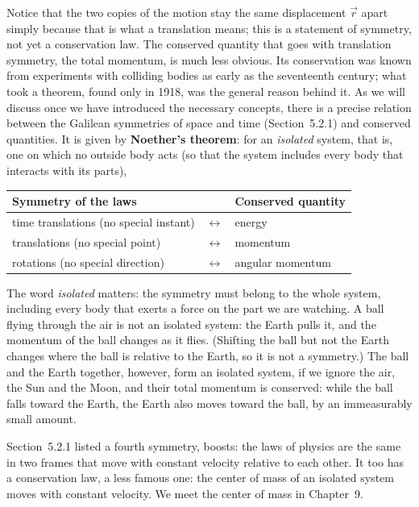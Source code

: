 \documentclass[11pt,a4paper]{article}
\begin{document}
Notice that the two copies of the motion stay the same displacement $\vec{r}$ apart simply because
that is what a translation means; this is a statement of symmetry, not yet a conservation law. The
conserved quantity that goes with translation symmetry, the total momentum, is much less obvious. Its
conservation was known from experiments with colliding bodies as early as the seventeenth century;
what took a theorem, found only in 1918, was the general reason behind it. As we will
discuss once we have introduced the necessary concepts, there is a precise relation between the
Galilean symmetries of space and time (Section~5.2.1) and conserved quantities. It is given by
\textbf{Noether's theorem}: for an \emph{isolated} system, that is, one on which no outside body acts
(so that the system includes every body that interacts with its parts),
\begin{center}
\begin{tabular}{l@{\qquad}c@{\qquad}l}
  \toprule
  Symmetry of the laws & & Conserved quantity \\
  \midrule
  time translations (no special instant) & $\longleftrightarrow$ & energy \\
  translations (no special point) & $\longleftrightarrow$ & momentum \\
  rotations (no special direction) & $\longleftrightarrow$ & angular momentum \\
  \bottomrule
\end{tabular}
\end{center}
The word \emph{isolated} matters: the symmetry must belong to the whole system, including every body
that exerts a force on the part we are watching. A ball flying through the air is not an isolated
system: the Earth pulls it, and the momentum of the ball changes as it flies. (Shifting the ball but
not the Earth changes where the ball is relative to the Earth, so it is not a symmetry.) The ball and
the Earth together, however, form an isolated system, if we ignore the air, the Sun and the Moon, and
their total momentum is conserved: while the ball falls toward the Earth, the Earth also moves toward
the ball, by an immeasurably small amount.

Section~5.2.1 listed a fourth symmetry, boosts: the laws of physics are the same in two frames that
move with constant velocity relative to each other. It too has a conservation law, a less famous one:
the center of mass of an isolated system moves with constant velocity. We meet the center of mass in
Chapter~9.
\end{document}
